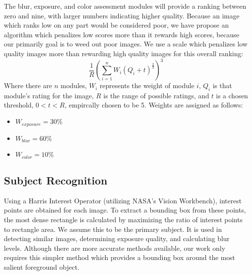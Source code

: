 \documentclass{article}
\begin{document}
The blur, exposure, and color assessment modules will provide a ranking between zero and nine, with larger numbers indicating higher quality. Because an image which ranks low on any part would be considered poor, we have propose an algorithm which penalizes low scores more than it rewards high scores, because our primarily goal is to weed out poor images. We use a scale which penalizes low quality images more than rewarding high quality images for this overall ranking:
\[
\frac{1}{R}\left(\displaystyle\sum\limits_{i=1}^nW_i\left({Q_i+t}\right)^\frac{2}{3}\right)^3
\]
Where there are \(n\) modules, \(W_i\) represents the weight of module \(i\), \(Q_i\) is that module's rating for the image, \(R\) is the range of possible ratings, and \(t\) is a chosen threshold, \(0<t<R\), empircally chosen to be 5. Weights are assigned as follows:
\begin{itemize}
\item \(W_{exposure}=30\%\)
\item \(W_{blur}=60\%\)
\item \(W_{color}=10\%\)
\end{itemize}

\subsection{Subject Recognition}\label{ContentRecognition}
Using a Harris Interest Operator (utilizing NASA's Vision Workbench\cite{vision-workbench}), interest points are obtained for each image. To extract a bounding box from these points, the most dense rectangle is calculated by maximizing the ratio of interest points to rectangle area. We assume this to be the primary subject. It is used in detecting similar images, determining exposure quality, and calculating blur levels. Although there are more accurate methods available\cite{5649226}, our work only requires this simpler method which provides a bounding box around the most salient foreground object.
\end{document}
